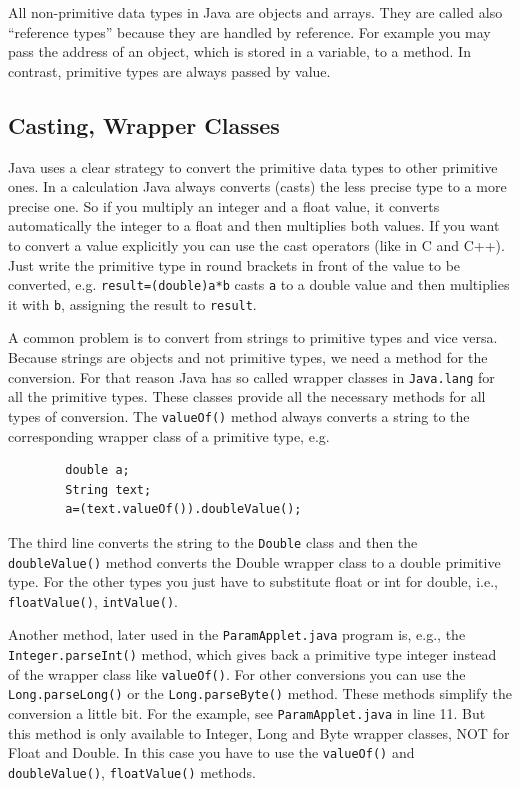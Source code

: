 All non-primitive data types in Java are objects and arrays. They are
called also ``reference types'' because they are handled by
reference. For example you may pass the address of an object, which is
stored in a variable, to a method. In contrast, primitive types are
always passed by value.


\subsection{Casting, Wrapper Classes}

Java uses a clear strategy to convert the primitive data types to 
other primitive ones. In a calculation Java always converts (casts)
the less precise type to a more precise one. So if you multiply an
integer and a float value, it converts automatically the integer to
a float and then multiplies both values. If you want to convert
a value explicitly you can use the cast operators (like in C and C++).
Just write the primitive type in round brackets in front of the value to
be converted, e.g. \verb|result=(double)a*b| casts \verb|a| to 
a double value and
then multiplies it with \verb|b|, assigning the result to \verb|result|.

A common problem is to convert from strings to primitive types and
vice versa. Because strings are objects and not primitive types, we
need a method for the conversion. For that reason Java has so called
wrapper classes in \verb|Java.lang| for all the primitive types. 
These classes provide all the necessary methods for all types of
conversion. The \verb|valueOf()| method always converts a string
to the corresponding wrapper class of a primitive type, e.g. 
\begin{verbatim}
        double a;
        String text;
        a=(text.valueOf()).doubleValue();
\end{verbatim}
The third line converts the string to the \verb|Double| class and then
the \verb|doubleValue()| method converts the Double wrapper class 
to a double primitive type.
For the other types you just have to substitute float or int 
for double, i.e., \verb|floatValue()|, \verb|intValue()|.
 
Another method, later used in the \verb|ParamApplet.java| program is, e.g.,
the \verb|Integer.parseInt()| method, which gives back a primitive
type integer instead of the wrapper class like \verb|valueOf()|.
For other conversions you can use the \verb|Long.parseLong()| or the
\verb|Long.parseByte()| method.
These methods  simplify the conversion a little bit. For the example, see
\verb|ParamApplet.java| in line 11. But this method is only 
available to Integer, Long and Byte wrapper classes, NOT for
Float and Double. In this case you have to use the \verb|valueOf()| and
\verb|doubleValue()|, \verb|floatValue()| methods.

